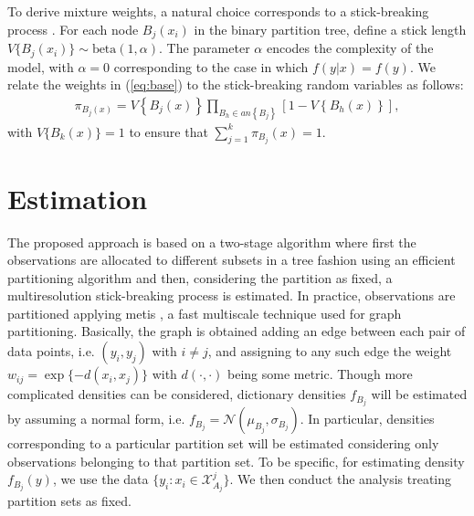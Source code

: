 \documentclass{article}
\providecommand{\mc}[1]{\mathcal{#1}}
\begin{document}
To derive mixture weights, a natural choice corresponds to a stick-breaking process \cite{stickbreaking}.  For each node $B_j(x_i)$ in the binary partition tree, define a stick length $V\{B_j(x_i)\} \sim \mbox{beta}(1,\alpha)$.  The parameter $\alpha$ encodes the complexity of the model, with $\alpha=0$ corresponding to the case in which $f(y|x) = f(y)$.  We relate the weights in (\ref{eq:base}) to the stick-breaking random variables as follows: 
\begin{eqnarray*}
\pi_{B_j(x)} = V\left\{B_j(x)\right\} \prod_{B_h \in an\left\{B_j\right\}} \left[1 - V\left\{B_h(x)\right\}\right],
\end{eqnarray*}
with $V\{B_k(x)\}=1$ to ensure that $\sum_{j=1}^k \pi_{B_j}(x) = 1$.    
\vskip 12pt


\section{Estimation}

The proposed approach is based on a two-stage algorithm where first the observations are allocated to different subsets in a tree fashion using an efficient partitioning algorithm and then, considering the partition as fixed, a multiresolution stick-breaking process is estimated. In practice, observations are partitioned applying metis \cite{metis}, a fast multiscale technique used for graph partitioning. Basically, the graph is obtained adding an edge between each pair of data points, i.e. $(y_i,y_j)$ with $i\not=j$, and assigning to any such edge the weight $w_{ij}=\exp\{-d(x_i,x_j)\}$ with $d(\cdot,\cdot)$ being some metric. Though more complicated densities can be considered, dictionary densities $f_{B_j}$ will be estimated by assuming a normal form, i.e. $f_{B_j}=\mc{N}(\mu_{B_j},\sigma_{B_j})$. In particular, densities corresponding to a particular partition set will be estimated considering only observations belonging to that partition set. To be specific, for estimating density $f_{B_j}(y)$, we use the data $\{ y_i: x_i \in \mathcal{X}^j_{A_j} \}$. We then conduct the analysis treating partition sets as fixed. 
\end{document}
